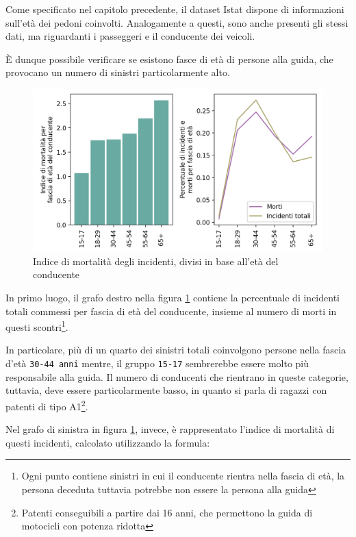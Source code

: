 \documentclass[a4paper,12pt]{report}
\newcommand{\columnstyle}[1]{\texttt{#1}}
\begin{document}
Come specificato nel capitolo precedente, il dataset Istat dispone di 
informazioni sull'età dei pedoni coinvolti. Analogamente a questi, 
sono anche presenti gli stessi dati, ma riguardanti i passeggeri e il conducente dei 
veicoli. 

\`E dunque possibile verificare se esistono fasce di età di persone alla guida, 
che provocano un numero di sinistri particolarmente alto. 

\begin{figure}
    \includegraphics[width=\linewidth]{../src/incidenti/incidenti_senza_coords/mortalita/indice_mortalita_eta.png}
    \caption{Indice di mortalità degli incidenti, divisi in base all'età del conducente}
    \label{fig:indice-mortalita-eta}
\end{figure}

In primo luogo, il grafo destro nella figura \ref{fig:indice-mortalita-eta} contiene 
la percentuale di incidenti totali commessi per fascia di età del conducente, insieme 
al numero di morti in questi scontri\footnote{Ogni punto contiene sinistri in 
cui il conducente rientra nella fascia di età, la persona deceduta tuttavia potrebbe non 
essere la persona alla guida}. 

In particolare, più di un quarto dei sinistri totali coinvolgono persone nella 
fascia d'età \columnstyle{30-44 anni} mentre, il gruppo \columnstyle{15-17} sembrerebbe 
essere molto più responsabile alla guida. Il numero di conducenti che rientrano 
in queste categorie, tuttavia, deve essere particolarmente basso, in quanto si 
parla di ragazzi con patenti di tipo A1\footnote{Patenti conseguibili a partire dai 16 anni, 
che permettono la guida di motocicli con potenza ridotta}. 

Nel grafo di sinistra in figura \ref{fig:indice-mortalita-eta}, invece, 
è rappresentato l'indice di mortalità di questi incidenti, 
calcolato utilizzando la formula: 
\end{document}
